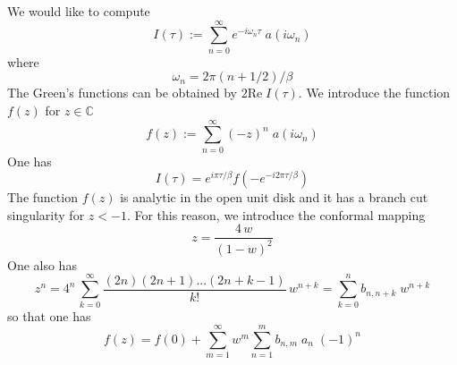 \documentclass{article}
\begin{document}
We would like to compute
$$
I(\tau) := \sum_{n=0}^\infty e^{-i\omega_n \tau}\; a(i\omega_n)
$$
where
$$
\omega_n  = 2\pi (n+1/2)/\beta
$$
The Green's functions can be obtained by $2\text{Re}\;I(\tau)$.
We introduce the function $f(z)$ for $z\in\mathbb{C}$
$$
f(z) := \sum_{n=0}^\infty (-z)^n \; a(i\omega_n)
$$
One has
$$
I(\tau) = e^{i\pi \tau/\beta} f(-e^{-i2\pi\tau/\beta})
$$
The function $f(z)$ is analytic in the open unit disk and it has a branch cut singularity for $z<-1$. For this reason, we introduce the conformal mapping
$$
z = \frac{4\,w}{(1-w)^2}
$$
One also has
$$
z^n = 4^n\, \sum_{k=0}^\infty \frac{(2n)(2n+1)...(2n+k-1)}{k!}\,w^{n+k} = \sum_{k=0}^n b_{n,n+k}\;w^{n+k}
$$
so that one has
$$
f(z)= f(0)+\sum_{m=1}^\infty w^m \sum_{n=1}^m b_{n, m}\;a_n\;(-1)^n
$$
\end{document}
